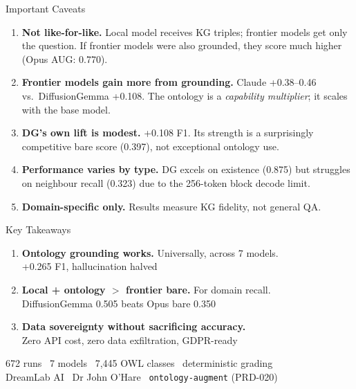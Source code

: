 \documentclass[aspectratio=169,11pt]{beamer}
\begin{document}
\begin{frame}{Important Caveats}
\begin{enumerate}
\item \textbf{Not like-for-like.} Local model receives KG triples; frontier models get only the
      question. If frontier models were also grounded, they score much higher (Opus AUG: 0.770).

\item \textbf{Frontier models gain more from grounding.} Claude +0.38--0.46 vs.\ DiffusionGemma
      +0.108. The ontology is a \emph{capability multiplier}; it scales with the base model.

\item \textbf{DG's own lift is modest.} +0.108 F1. Its strength is a surprisingly competitive
      bare score (0.397), not exceptional ontology use.

\item \textbf{Performance varies by type.} DG excels on existence (0.875) but struggles on
      neighbour recall (0.323) due to the 256-token block decode limit.

\item \textbf{Domain-specific only.} Results measure KG fidelity, not general QA.
\end{enumerate}
\end{frame}

\begin{frame}{Key Takeaways}
\Large
\begin{enumerate}
\item \textcolor{teal0}{\textbf{Ontology grounding works.}} Universally, across 7 models.\\
      {\normalsize +0.265 F1, hallucination halved}

\vspace{4mm}
\item \textcolor{softgreen}{\textbf{Local + ontology $>$ frontier bare.}} For domain recall.\\
      {\normalsize DiffusionGemma 0.505 beats Opus bare 0.350}

\vspace{4mm}
\item \textcolor{burnt}{\textbf{Data sovereignty without sacrificing accuracy.}}\\
      {\normalsize Zero API cost, zero data exfiltration, GDPR-ready}
\end{enumerate}

\vfill
\begin{center}
{\small\textcolor{grayln}{672 runs \textbullet\ 7 models \textbullet\ 7{,}445 OWL classes \textbullet\ deterministic grading}}\\[4pt]
{\footnotesize\textcolor{teal0}{DreamLab AI} \textbullet\ Dr John O'Hare \textbullet\ \texttt{ontology-augment} (PRD-020)}
\end{center}
\end{frame}
\end{document}
